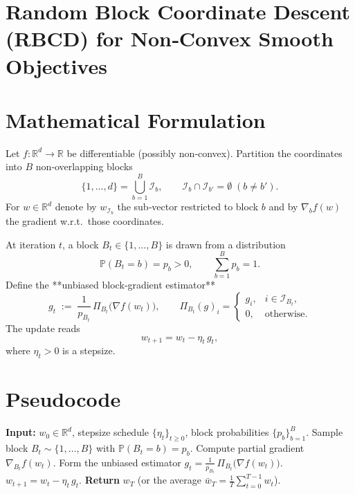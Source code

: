 \documentclass{article}
\newcommand{\R}{\mathbb{R}}
\begin{document}
\section*{Random Block Coordinate Descent (RBCD) for Non‑Convex Smooth Objectives}

\section*{Mathematical Formulation}
Let $f:\R^{d}\rightarrow\R$ be differentiable (possibly non‑convex).  
Partition the coordinates into $B$ non‑overlapping blocks
\[
\{1,\dots ,d\}= \bigcup_{b=1}^{B}\mathcal{I}_{b},\qquad 
\mathcal{I}_{b}\cap\mathcal{I}_{b'}=\emptyset\;(b\neq b').
\]
For $w\in\R^{d}$ denote by $w_{\mathcal{I}_{b}}$ the sub‑vector restricted to block $b$ and by
$\nabla_{b} f(w)$ the gradient w.r.t.\ those coordinates.

At iteration $t$, a block $B_{t}\in\{1,\dots ,B\}$ is drawn from a distribution
\[
\mathbb{P}(B_{t}=b)=p_{b}>0,\qquad \sum_{b=1}^{B}p_{b}=1 .
\]
Define the **unbiased block‑gradient estimator**
\[
g_{t}\;:=\;\frac{1}{p_{B_{t}}}\,\Pi_{B_{t}}\bigl(\nabla f(w_{t})\bigr),
\qquad 
\Pi_{B_{t}}(g)_{i}= 
\begin{cases}
g_{i}, & i\in\mathcal{I}_{B_{t}},\\[2pt]
0, & \text{otherwise}.
\end{cases}
\tag{1}
\]
The update reads
\[
w_{t+1}= w_{t}-\eta_{t}\,g_{t},
\tag{2}
\]
where $\eta_{t}>0$ is a stepsize.

\section*{Pseudocode}
\begin{algorithm}[H]
\caption{Random Block Coordinate Descent (RBCD)}
\begin{algorithmic}[1]
\STATE \textbf{Input:} $w_{0}\in\R^{d}$, stepsize schedule $\{\eta_{t}\}_{t\ge0}$, block probabilities $\{p_{b}\}_{b=1}^{B}$.
    \STATE Sample block $B_{t}\sim\{1,\dots ,B\}$ with $\mathbb{P}(B_{t}=b)=p_{b}$.
    \STATE Compute partial gradient $\nabla_{B_{t}} f(w_{t})$.
    \STATE Form the unbiased estimator $g_{t}= \frac{1}{p_{B_{t}}}\,\Pi_{B_{t}}\bigl(\nabla f(w_{t})\bigr)$.
    \STATE $w_{t+1}= w_{t}-\eta_{t}\,g_{t}$.
\ENDFOR
\STATE \textbf{Return} $w_{T}$ (or the average $\bar w_T=\frac1T\sum_{t=0}^{T-1}w_{t}$).
\end{algorithmic}
\end{algorithm}
\end{document}
